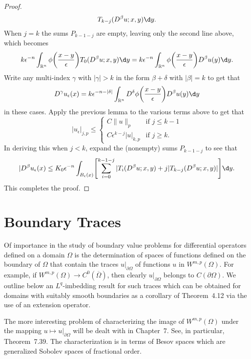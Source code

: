 \begin{proof}
\begin{align*}
        T_{k-j}(D^\beta u;x,y) \d y.
  \end{align*}
  When $j=k$ the sums $P_{k-1-j}$ are empty, leaving only the second
  line above, which becomes
  \[ k\epsilon^{-n} \int_{\mathbb{R}^n} \phi\biggl(\frac{x-y}{\epsilon}\biggr)
      T_0(D^\beta u;x,y) \d y
      = k\epsilon^{-n} \int_{\mathbb{R}^n} \phi\biggl(\frac{x-y}{\epsilon}\biggr)
        D^\beta u(y) \d y. \]
  Write any multi-index $\gamma$ with $|\gamma|>k$ in the form $\beta+\delta$
  with $|\beta|=k$ to get that
  \[ D^{\gamma} u_{\epsilon}(x) = k\epsilon^{-n-|\delta|}
      \int_{\mathbb{R}^n} D^{\delta} \phi\biggl(\frac{x-y}{\epsilon}\biggr)
      D^{\beta} u(y) \d y \]
  in these cases. Apply the previous lemma to the various terms above to get that
  \[ |u_{\epsilon}|_{j,p} \leq
      \begin{cases}
        C \|u\|_p & \text{if } j\leq k-1 \\
        C \epsilon^{k-j} |u|_{k,p} & \text{if } j\geq k.
      \end{cases}\]
  In deriving this when $j<k$, expand the (nonempty) sums $P_{k-1-j}$
  to see that
  \[ |D^{\beta} u_{\epsilon}(x) \leq K_0 \epsilon^{-n}
      \int_{B_{\epsilon}(x)} \Biggl[\sum_{i=0}^{k-1-j} |T_i(D^\beta u;x,y)
        + j |T_{k-j}(D^\beta u;x,y)|\Biggr] \d y. \]
  This completes the proof.
\end{proof}


\section{Boundary Traces}

\begin{para}
  Of importance in the study of boundary value problems for differential
  operators defined on a domain $\Omega$ is the determination of spaces
  of functions defined on the boundary of $\Omega$ that contain the
  traces $u|_{\partial\Omega}$ of functions $u$ in $W^{m,p}(\Omega)$.
  For example, if $W^{m,p}(\Omega) \to C^0(\overline{\Omega})$, then
  clearly $u|_{\partial\Omega}$ belongs to $C(\partial\Omega)$. We outline
  below an $L^q$-imbedding result for such traces which can be obtained
  for domains with suitably smooth boundaries as a corollary of Theorem~4.12
  via the use of an extension operator.

  The more interesting problem of characterizing the image of $W^{m,p}(\Omega)$
  under the mapping $u \mapsto u|_{\partial\Omega}$ will be dealt with in
  Chapter~7. See, in particular, Theorem~7.39. The characterization is
  in terms of Besov spaces which are generalized Sobolev spaces of fractional
  order.
\end{para}

